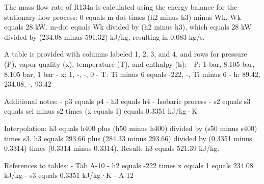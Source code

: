 The mass flow rate of R134a is calculated using the energy balance for the stationary flow process:  
0 equals m-dot times (h2 minus h3) minus Wk.  
Wk equals 28 kW.  
m-dot equals Wk divided by (h2 minus h3), which equals 28 kW divided by (234.08 minus 591.32) kJ/kg, resulting in 0.083 kg/s.  

A table is provided with columns labeled 1, 2, 3, and 4, and rows for pressure (P), vapor quality (x), temperature (T), and enthalpy (h):  
- P: 1 bar, 8.105 bar, 8.105 bar, 1 bar  
- x: 1, -, -, 0  
- T: Ti minus 6 equals -222, -, Ti minus 6  
- h: 89.42, 234.08, -, 93.42  

Additional notes:  
- p3 equals p4  
- h3 equals h4  
- Isobaric process  
- s2 equals s3 equals sei minus s2 times (x equals 1) equals 0.3351 kJ/kg·K  

Interpolation:  
h3 equals h400 plus (h50 minus h400) divided by (s50 minus s400) times s3.  
h3 equals 293.66 plus (284.33 minus 293.66) divided by (0.3351 minus 0.3314) times (0.3314 minus 0.3314).  
Result: h3 equals 521.39 kJ/kg.  

References to tables:  
- Tab A-10  
- h2 equals -222 times x equals 1 equals 234.08 kJ/kg  
- s3 equals 0.3351 kJ/kg·K  
- A-12
